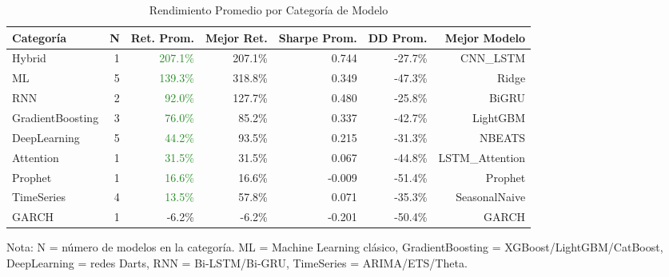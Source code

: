 \begin{table}[htbp]
\centering
\caption{Rendimiento Promedio por Categor\'ia de Modelo}
\label{tab:category_comparison}
\begin{tabular}{@{}lrrrrrr@{}}
\toprule
\textbf{Categor\'ia} & \textbf{N} & \textbf{Ret. Prom.} & \textbf{Mejor Ret.} & \textbf{Sharpe Prom.} & \textbf{DD Prom.} & \textbf{Mejor Modelo} \\
\midrule
Hybrid & 1 & \textcolor{ForestGreen}{207.1\%} & 207.1\% & 0.744 & -27.7\% & CNN\_LSTM \\
ML & 5 & \textcolor{ForestGreen}{139.3\%} & 318.8\% & 0.349 & -47.3\% & Ridge \\
RNN & 2 & \textcolor{ForestGreen}{92.0\%} & 127.7\% & 0.480 & -25.8\% & BiGRU \\
GradientBoosting & 3 & \textcolor{ForestGreen}{76.0\%} & 85.2\% & 0.337 & -42.7\% & LightGBM \\
DeepLearning & 5 & \textcolor{ForestGreen}{44.2\%} & 93.5\% & 0.215 & -31.3\% & NBEATS \\
Attention & 1 & \textcolor{ForestGreen}{31.5\%} & 31.5\% & 0.067 & -44.8\% & LSTM\_Attention \\
Prophet & 1 & \textcolor{ForestGreen}{16.6\%} & 16.6\% & -0.009 & -51.4\% & Prophet \\
TimeSeries & 4 & \textcolor{ForestGreen}{13.5\%} & 57.8\% & 0.071 & -35.3\% & SeasonalNaive \\
GARCH & 1 & \textcolor{BrickRed}{-6.2\%} & -6.2\% & -0.201 & -50.4\% & GARCH \\
\bottomrule
\end{tabular}
\begin{tablenotes}
\small
\item Nota: N = n\'umero de modelos en la categor\'ia. ML = Machine Learning cl\'asico, GradientBoosting = XGBoost/LightGBM/CatBoost, DeepLearning = redes Darts, RNN = Bi-LSTM/Bi-GRU, TimeSeries = ARIMA/ETS/Theta.
\end{tablenotes}
\end{table}
